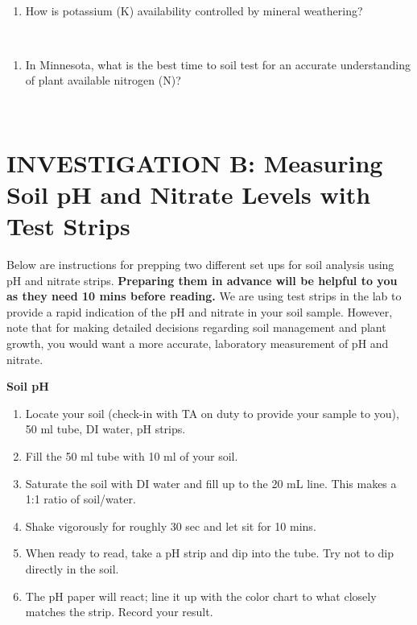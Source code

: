 \documentclass[
  letterpaper,
  twocolumn,
  portrait]{scrbook}
\providecommand{\tightlist}{%
  \setlength{\itemsep}{0pt}\setlength{\parskip}{0pt}}\usepackage{longtable,booktabs,array}
\begin{document}
~ ~ ~

\begin{enumerate}
\def\labelenumi{\arabic{enumi}.}
\setcounter{enumi}{1}
\tightlist
\item
  How is potassium (K) availability controlled by mineral weathering?
\end{enumerate}

~ ~ ~

\begin{enumerate}
\def\labelenumi{\arabic{enumi}.}
\setcounter{enumi}{2}
\tightlist
\item
  In Minnesota, what is the best time to soil test for an accurate
  understanding of plant available nitrogen (N)?
\end{enumerate}

~ ~ ~

\hypertarget{investigation-b-measuring-soil-ph-and-nitrate-levels-with-test-strips}{%
\section{INVESTIGATION B: Measuring Soil pH and Nitrate Levels with Test
Strips}\label{investigation-b-measuring-soil-ph-and-nitrate-levels-with-test-strips}}

Below are instructions for prepping two different set ups for soil
analysis using pH and nitrate strips. \textbf{Preparing them in advance
will be helpful to you as they need 10 mins before reading.} We are
using test strips in the lab to provide a rapid indication of the pH and
nitrate in your soil sample. However, note that for making detailed
decisions regarding soil management and plant growth, you would want a
more accurate, laboratory measurement of pH and nitrate.

\textbf{Soil pH}

\begin{enumerate}
\def\labelenumi{\arabic{enumi}.}
\item
  Locate your soil (check-in with TA on duty to provide your sample to
  you), 50 ml tube, DI water, pH strips.
\item
  Fill the 50 ml tube with 10 ml of your soil.
\item
  Saturate the soil with DI water and fill up to the 20 mL line. This
  makes a 1:1 ratio of soil/water.
\item
  Shake vigorously for roughly 30 sec and let sit for 10 mins.
\item
  When ready to read, take a pH strip and dip into the tube. Try not to
  dip directly in the soil.
\item
  The pH paper will react; line it up with the color chart to what
  closely matches the strip. Record your result.
\end{enumerate}
\end{document}
